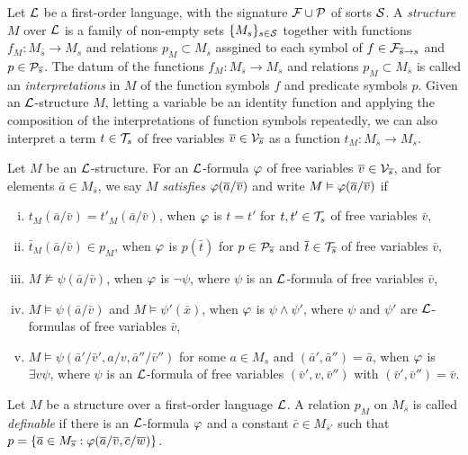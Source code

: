 \documentclass{../../large}
\begin{document}
\begin{prb}
Let $\mathcal{L}$ be a first-order language, with the signature $\mathcal{F}\cup\mathcal{P}$ of sorts $\mathcal{S}$.
A \emph{structure} $M$ over $\mathcal{L}$ is a family of non-empty sets $\{M_s\}_{s\in\mathcal{S}}$ together with functions $f_M:M_{\bar s}\to M_s$ and relations $p_M\subset M_{\bar s}$ assgined to each symbol of $f\in\mathcal{F}_{\overline s\to s}$ and $p\in\mathcal{P}_{\overline s}$.
The datum of the functions $f_M:M_{\bar s}\to M_s$ and relations $p_M\subset M_{\bar s}$ is called an \emph{interpretations} in $M$ of the function symbols $f$ and predicate symbols $p$.
Given an $\mathcal{L}$-structure $M$, letting a variable be an identity function and applying the composition of the interpretations of function symbols repeatedly, we can also interpret a term $t\in\mathcal{T}_s$ of free variables $\overline v\in\mathcal{V}_{\overline s}$ as a function $t_M:M_{\bar s}\to M_s$.


Let $M$ be an $\mathcal{L}$-structure.
For an $\mathcal{L}$-formula $\varphi$ of free variables $\overline v\in\mathcal{V}_{\overline s}$, and for elements $\bar a\in M_{\bar s}$, we say $M$ \emph{satisfies} $\varphi(\overline a/\overline v)$ and write $M\vDash\varphi(\overline a/\overline v)$ if
\begin{enumerate}[(i)]
\item $t_M(\bar a/\bar v)=t'_M(\bar a/\bar v)$, when $\varphi$ is $t=t'$ for $t,t'\in\mathcal{T}_s$ of free variables $\bar v$,
\item $\bar t_M(\bar a/\bar v)\in p_M$, when $\varphi$ is $p(\bar t)$ for $p\in\mathcal{P}_{\overline s}$ and $\overline t\in\mathcal{T}_{\overline s}$ of free variables $\bar v$,
\item $M\not\vDash\psi(\bar a/\bar v)$, when $\varphi$ is $\neg\psi$, where $\psi$ is an $\mathcal{L}$-formula of free variables $\bar v$,
\item $M\vDash\psi(\bar a/\bar v)$ and $M\vDash\psi'(\bar x)$, when $\varphi$ is $\psi\wedge\psi'$, where $\psi$ and $\psi'$ are $\mathcal{L}$-formulas of free variables $\bar v$,
\item $M\vDash\psi(\bar a'/\bar v',a/v,\bar a''/\bar v'')$ for some $a\in M_s$ and $(\bar a',\bar a'')=\bar a$, when $\varphi$ is $\exists v\psi$, where $\psi$ is an $\mathcal{L}$-formula of free variables $(\bar v',v,\bar v'')$ with $(\bar v',\bar v'')=\bar v$.
\end{enumerate}
\end{prb}

\begin{prb}
\end{prb}



Let $M$ be a structure over a first-order language $\mathcal{L}$.
A relation $p_M$ on $M_{\bar s}$ is called \emph{definable} if there is an $\mathcal{L}$-formula $\varphi$ and a constant $\bar c\in M_{\bar s'}$ such that $p=\{\overline a\in M_{\overline s}:\varphi(\overline a/\overline v,\overline c/\overline w)\}$.
\end{document}
